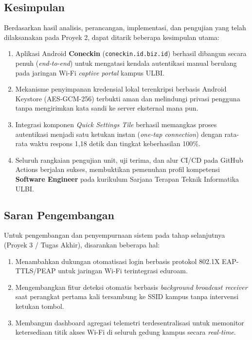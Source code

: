 \subsection{Kesimpulan}
Berdasarkan hasil analisis, perancangan, implementasi, dan pengujian yang telah dilaksanakan pada Proyek 2, dapat ditarik beberapa kesimpulan utama:
\begin{enumerate}
    \item Aplikasi Android \textbf{Coneckin} (\texttt{coneckin.id.biz.id}) berhasil dibangun secara penuh (\textit{end-to-end}) untuk mengatasi kendala autentikasi manual berulang pada jaringan Wi-Fi \textit{captive portal} kampus ULBI.
    \item Mekanisme penyimpanan kredensial lokal terenkripsi berbasis Android Keystore (AES-GCM-256) terbukti aman dan melindungi privasi pengguna tanpa mengirimkan kata sandi ke server eksternal mana pun.
    \item Integrasi komponen \textit{Quick Settings Tile} berhasil memangkas proses autentikasi menjadi satu ketukan instan (\textit{one-tap connection}) dengan rata-rata waktu respons 1,18 detik dan tingkat keberhasilan 100\%.
    \item Seluruh rangkaian pengujian unit, uji terima, dan alur CI/CD pada GitHub Actions berjalan sukses, membuktikan pemenuhan profil kompetensi \textbf{Software Engineer} pada kurikulum Sarjana Terapan Teknik Informatika ULBI.
\end{enumerate}

\subsection{Saran Pengembangan}
Untuk pengembangan dan penyempurnaan sistem pada tahap selanjutnya (Proyek 3 / Tugas Akhir), disarankan beberapa hal:
\begin{enumerate}
    \item Menambahkan dukungan otomatisasi login berbasis protokol 802.1X EAP-TTLS/PEAP untuk jaringan Wi-Fi terintegrasi eduroam.
    \item Mengembangkan fitur deteksi otomatis berbasis \textit{background broadcast receiver} saat perangkat pertama kali tersambung ke SSID kampus tanpa intervensi ketukan tombol.
    \item Membangun dashboard agregasi telemetri terdesentralisasi untuk memonitor ketersediaan titik akses Wi-Fi di seluruh gedung kampus secara \textit{real-time}.
\end{enumerate}
